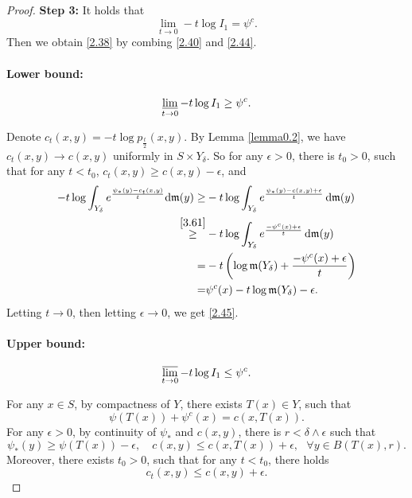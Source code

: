 \documentclass[10pt,a4paper]{amsart}
\renewcommand{\d}{{\mathrm d}}
\newcommand{\limi}{\varliminf}
\newcommand{\lims}{\varlimsup}
\newcommand{\mm}{\mathfrak m}
\begin{document}
\begin{proof}
	\medskip
	
	{\bf Step 3:} It holds that
	\begin{equation}\label{2.44}
		\lim_{t\rightarrow0} -t\log I_1=\psi^c.
	\end{equation}
Then we obtain \eqref{2.38} by combing \eqref{2.40}  and \eqref{2.44}.
     
		
	\paragraph{Lower bound:}
		\begin{equation}\label{2.45}
		\limi_{t\rightarrow0}	-t\log I_1\geq \psi^c.
	\end{equation}

		
		 Denote   $c_t(x,y)=-t \log p_\frac{t}{2}(x,y)$.   By Lemma \ref{lemma0.2},  we have $c_t(x,y)\rightarrow c(x,y)$ uniformly in $S\times Y_\delta$.    So for any $\epsilon>0$, there is $t_0>0$, such that for any $t<t_0$, 
		$c_t(x,y)\geq c(x,y)-\epsilon$, 
		and
		\begin{equation}\label{2.46}
			\begin{aligned}
				-t\log\int_{Y_\delta} e^{\frac{\psi_*(y)-c_t(x,y)}{t}}\d\mm(y)
				\geq &-t\log\int_{Y_\delta} e^{\frac{\psi_*(y)-c(x,y)+\epsilon}{t}}\,\d\mm(y)\\
				\overset{\eqref{3.61}}{\geq} &-t \log\int_{Y_\delta} e^{\frac{-\psi^c(x)+\epsilon}{t}}\,\d\mm(y)\\
				= & -t\left (\log\mm(Y_\delta)+\frac{-\psi^c(x)+\epsilon}{t}\right)\\
				=&\psi^c(x)-t\log\mm(Y_\delta)-\epsilon.
			\end{aligned}
		\end{equation}
		 Letting $t\rightarrow0$,  then letting $\epsilon\rightarrow0$, we get \eqref{2.45}.
		
		
		\paragraph{Upper bound:}
			\begin{equation}\label{2.47}
		\lims_{t\rightarrow0}	-t\log I_1\leq \psi^c.
	\end{equation}


		
		For  any $x\in S$,  by compactness of $Y$,  there exists  $T(x)\in Y$, such that
		$$\psi(T(x))+\psi^c(x)=c(x,T(x)).$$
		For any $\epsilon>0$, by continuity of $\psi_{*}$ and $c(x, y)$,  there is $r<\delta \wedge \epsilon$ such that
		$$\psi_{*}(y)\geq \psi(T(x))-\epsilon,\quad c(x,y)\leq c(x,T(x))+\epsilon,~~~\forall y\in B(T(x), r).$$
		Moreover, there exists $t_0>0$,  such that for any $t<t_0$, there holds
		$$c_t(x,y)\leq c(x,y)+\epsilon.$$
		

\end{proof}
\end{document}
